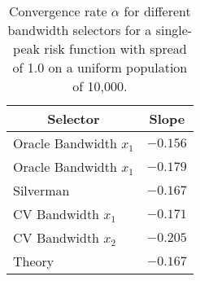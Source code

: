 \begin{table}[htbp]
\begin{center}
\begin{tabular}{lr}
\hline\hline
\multicolumn{1}{c}{Selector}&\multicolumn{1}{c}{Slope}\tabularnewline
\hline
Oracle Bandwidth $x_1$&$-0.156$\tabularnewline
Oracle Bandwidth $x_1$&$-0.179$\tabularnewline
Silverman&$-0.167$\tabularnewline
CV Bandwidth $x_1$&$-0.171$\tabularnewline
CV Bandwidth $x_2$&$-0.205$\tabularnewline
Theory&$-0.167$\tabularnewline
\hline
\end{tabular}
\caption[Convergence rate of different bandwidth selectors]{Convergence rate $\alpha$ for different bandwidth selectors for a single-peak risk function with spread of 1.0 on a uniform population of 10,000.\label{tab:results:alpha_by_selector}}\end{center}
\end{table}
